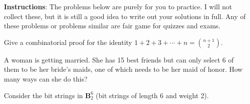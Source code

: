\documentclass[10pt]{exam}
\def\b{\mathbf}
\begin{document}
\noindent \textbf{Instructions}: The problems below are purely for you to practice.  I will not collect these, but it is still a good idea to write out your solutions in full.  Any of these problems or problems similar are fair game for quizzes and exams.  

\begin{questions}
\question Give a combinatorial proof for the identity $1 + 2 + 3 + \cdots + n = {n+1 \choose 2}$. 

\question A woman is getting married.  She has 15 best friends but can only select 6 of them to be her bride's maids, one of which needs to be her maid of honor.  How many ways can she do this?

\question Consider the bit strings in $\b B^6_2$ (bit strings of length 6 and weight 2).
\end{questions}
\end{document}
